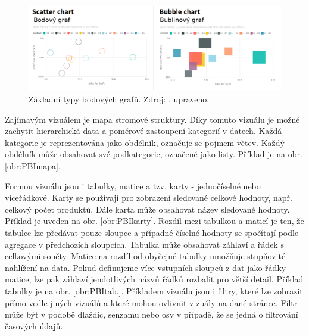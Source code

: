 \begin{figure}[h!]
    \centering
    \captionsetup{justification=centering}
    \includegraphics[width=.9\textwidth]{obrazky/PBIteorie/power-bi-compare-charts.png}
    \caption{Základní typy bodových grafů. 
    Zdroj: \cite{bib:PBI}, upraveno.}
    \label{obr:PBI:grafybod}
\end{figure}

Zajímavým vizuálem je mapa stromové struktury. Díky tomuto vizuálu je možné zachytit hierarchická data a poměrové zastoupení kategorií v datech. Každá kategorie je reprezentována jako obdélník, označuje se pojmem větev. Každý obdélník může obsahovat své podkategorie, označené jako listy. Příklad je na obr. \ref*{obr:PBImapa}.

Formou vizuálu jsou i tabulky, matice a tzv. karty - jednočíselné nebo víceřádkové. Karty se používají pro zobrazení sledované celkové hodnoty, např. celkový počet produktů. Dále karta může obsahovat název sledované hodnoty. Příklad je uveden na obr. \ref*{obr:PBIkarty}. 
Rozdíl mezi tabulkou a maticí je ten, že tabulce lze předávat pouze sloupce a případné číselné hodnoty se spočítají podle agregace v předchozích sloupcích. Tabulka může obsahovat záhlaví a řádek s celkovými součty. Matice na rozdíl od obyčejné tabulky umožňuje stupňovité nahlížení na data. Pokud definujeme více vstupních sloupců z dat jako řádky matice, lze pak záhlaví jendotlivých názvů řádků rozbalit pro větší detail. Příklad tabulky je na obr.         \ref*{obr:PBItab.}. 
Příkladem vizuálu jsou i filtry, které lze zobrazit přímo vedle jiných vizuálů a které mohou ovlivnit vizuály na dané stránce. Filtr může být v podobě dlaždic, senzamu nebo osy v případě, že se jedná o filtrování časových údajů.

